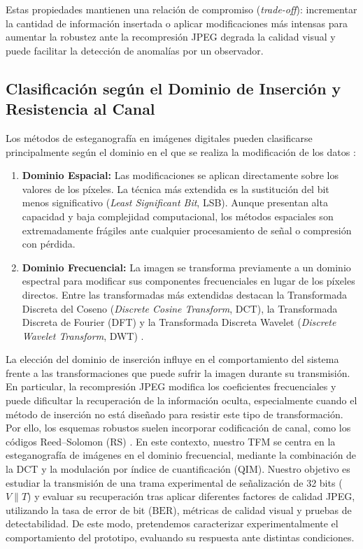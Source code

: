 \documentclass[IB]{TFUOC}%
\begin{document}
Estas propiedades mantienen una relación de compromiso (\textit{trade-off}): incrementar la cantidad de información insertada o aplicar modificaciones más intensas para aumentar la robustez ante la recompresión JPEG degrada la calidad visual y puede facilitar la detección de anomalías por un observador.

\subsection{Clasificación según el Dominio de Inserción y Resistencia al Canal}

Los métodos de esteganografía en imágenes digitales pueden clasificarse principalmente según el dominio en el que se realiza la modificación de los datos \cite{3}:

\begin{enumerate}
    \item \textbf{Dominio Espacial:} Las modificaciones se aplican directamente sobre los valores de los píxeles. La técnica más extendida es la sustitución del bit menos significativo (\textit{Least Significant Bit}, LSB). Aunque presentan alta capacidad y baja complejidad computacional, los métodos espaciales son extremadamente frágiles ante cualquier procesamiento de señal o compresión con pérdida.
    \item \textbf{Dominio Frecuencial:} La imagen se transforma previamente a un dominio espectral para modificar sus componentes frecuenciales en lugar de los píxeles directos. Entre las transformadas más extendidas destacan la Transformada Discreta del Coseno (\textit{Discrete Cosine Transform}, DCT), la Transformada Discreta de Fourier (DFT) y la Transformada Discreta Wavelet (\textit{Discrete Wavelet Transform}, DWT) \cite{14}.
\end{enumerate}

La elección del dominio de inserción influye en el comportamiento del sistema frente a las transformaciones que puede sufrir la imagen durante su transmisión. En particular, la recompresión JPEG modifica los coeficientes frecuenciales y puede dificultar la recuperación de la información oculta, especialmente cuando el método de inserción no está diseñado para resistir este tipo de transformación. Por ello, los esquemas robustos suelen incorporar codificación de canal, como los códigos Reed--Solomon (RS) \cite{reed1960,20}. En este contexto, nuestro TFM se centra en la esteganografía de imágenes en el dominio frecuencial, mediante la combinación de la DCT y la modulación por índice de cuantificación (QIM). Nuestro objetivo es estudiar la transmisión de una trama experimental de señalización de 32 bits ($V \parallel T$) y evaluar su recuperación tras aplicar diferentes factores de calidad JPEG, utilizando la tasa de error de bit ($\mathrm{BER}$), métricas de calidad visual y pruebas de detectabilidad. De este modo, pretendemos caracterizar experimentalmente el comportamiento del prototipo, evaluando su respuesta ante distintas condiciones.
\end{document}
